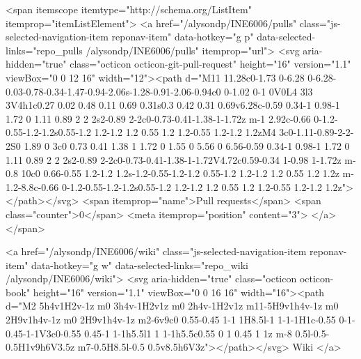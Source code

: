   <span itemscope itemtype="http://schema.org/ListItem" itemprop="itemListElement">
    <a href="/alysondp/INE6006/pulls" class="js-selected-navigation-item reponav-item" data-hotkey="g p" data-selected-links="repo_pulls /alysondp/INE6006/pulls" itemprop="url">
      <svg aria-hidden="true" class="octicon octicon-git-pull-request" height="16" version="1.1" viewBox="0 0 12 16" width="12"><path d="M11 11.28c0-1.73 0-6.28 0-6.28-0.03-0.78-0.34-1.47-0.94-2.06s-1.28-0.91-2.06-0.94c0 0-1.02 0-1 0V0L4 3l3 3V4h1c0.27 0.02 0.48 0.11 0.69 0.31s0.3 0.42 0.31 0.69v6.28c-0.59 0.34-1 0.98-1 1.72 0 1.11 0.89 2 2 2s2-0.89 2-2c0-0.73-0.41-1.38-1-1.72z m-1 2.92c-0.66 0-1.2-0.55-1.2-1.2s0.55-1.2 1.2-1.2 1.2 0.55 1.2 1.2-0.55 1.2-1.2 1.2zM4 3c0-1.11-0.89-2-2-2S0 1.89 0 3c0 0.73 0.41 1.38 1 1.72 0 1.55 0 5.56 0 6.56-0.59 0.34-1 0.98-1 1.72 0 1.11 0.89 2 2 2s2-0.89 2-2c0-0.73-0.41-1.38-1-1.72V4.72c0.59-0.34 1-0.98 1-1.72z m-0.8 10c0 0.66-0.55 1.2-1.2 1.2s-1.2-0.55-1.2-1.2 0.55-1.2 1.2-1.2 1.2 0.55 1.2 1.2z m-1.2-8.8c-0.66 0-1.2-0.55-1.2-1.2s0.55-1.2 1.2-1.2 1.2 0.55 1.2 1.2-0.55 1.2-1.2 1.2z"></path></svg>
      <span itemprop="name">Pull requests</span>
      <span class="counter">0</span>
      <meta itemprop="position" content="3">
</a>  </span>

    <a href="/alysondp/INE6006/wiki" class="js-selected-navigation-item reponav-item" data-hotkey="g w" data-selected-links="repo_wiki /alysondp/INE6006/wiki">
      <svg aria-hidden="true" class="octicon octicon-book" height="16" version="1.1" viewBox="0 0 16 16" width="16"><path d="M2 5h4v1H2v-1z m0 3h4v-1H2v1z m0 2h4v-1H2v1z m11-5H9v1h4v-1z m0 2H9v1h4v-1z m0 2H9v1h4v-1z m2-6v9c0 0.55-0.45 1-1 1H8.5l-1 1-1-1H1c-0.55 0-1-0.45-1-1V3c0-0.55 0.45-1 1-1h5.5l1 1 1-1h5.5c0.55 0 1 0.45 1 1z m-8 0.5l-0.5-0.5H1v9h6V3.5z m7-0.5H8.5l-0.5 0.5v8.5h6V3z"></path></svg>
      Wiki
</a>

